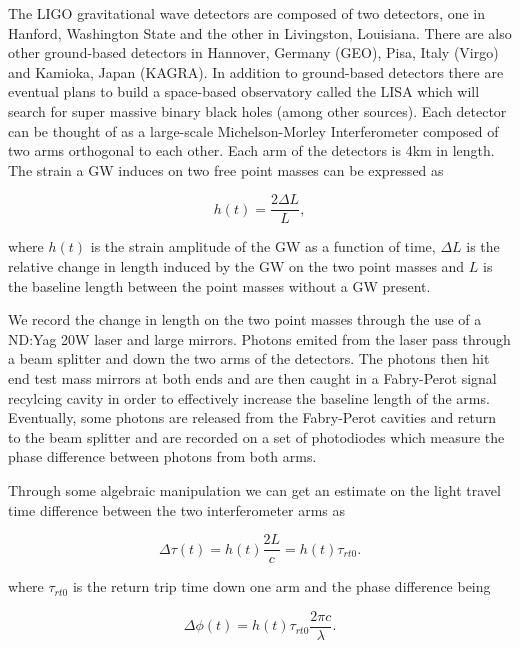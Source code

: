 The \ac{LIGO} gravitational wave detectors are composed of 
two detectors, one in Hanford, Washington State and the 
other in Livingston, Louisiana. There are also other ground-based detectors 
in Hannover, Germany (GEO), Pisa, Italy (Virgo) and Kamioka, Japan 
(KAGRA). In addition to ground-based detectors there are eventual plans 
to build a space-based observatory called the \ac{LISA} which 
will search for super massive binary black holes (among other 
sources). Each detector can be thought 
of as a large-scale Michelson-Morley Interferometer composed 
of two arms orthogonal to each other. Each arm of 
the detectors is 4km in length. The strain a \ac{GW} induces on two free point masses 
can be expressed as 

\begin{equation}
    h(t) = \frac{2 \Delta L}{L},
\end{equation}

where $h(t)$ is the strain amplitude of the \ac{GW} 
as a function of time, $\Delta L$ is 
the relative change in length induced by the \ac{GW} on the two 
point masses and $L$ is the baseline length between the point 
masses without a \ac{GW} present. 

We record the change in length 
on the two point masses through the use of a ND:Yag 20W 
laser and large mirrors. Photons emited from the laser pass through a beam 
splitter and down the two arms of the detectors. The 
photons then hit end test mass mirrors at both ends 
and are then caught in a Fabry-Perot signal recylcing 
cavity in order to effectively increase the baseline 
length of the arms. Eventually, some photons are released 
from the Fabry-Perot cavities and return to the beam splitter 
and are recorded on a set of photodiodes which measure 
the phase difference between photons from both 
arms.

Through some algebraic manipulation we can get an estimate on the 
light travel time difference between the two interferometer 
arms as 

\begin{equation}
    \Delta \tau(t) = h(t) \frac{2L}{c} = h(t) \tau_{rt0}.
\end{equation}

%
%
where $\tau_{rt0}$ is the return trip time down 
one arm and the phase difference being 

\begin{equation}
    \Delta \phi(t) = h(t) \tau_{rt0} \frac{2\pi c}{\lambda}.
\end{equation}

